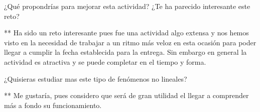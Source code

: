 \documentclass{article} %
\begin{document}
\vspace{0.5 cm}


¿Qué propondrías para mejorar esta actividad? ¿Te ha parecido interesante este reto?

\vspace{0.5 cm}

** Ha sido un reto interesante pues fue una actividad algo extensa y nos hemos visto en la necesidad de trabajar a un ritmo más veloz en esta ocasión para poder llegar a cumplir la fecha establecida para la entrega. Sin embargo en general la actividad es atractiva y se puede completar en el tiempo y forma.

\vspace{0.5 cm}


¿Quisieras estudiar mas este tipo de fenómenos no lineales?

\vspace{0.5 cm}

** Me gustaría, pues considero que será de gran utilidad el llegar a comprender más a fondo su funcionamiento. 

\vspace{0.5 cm}
\end{document}
